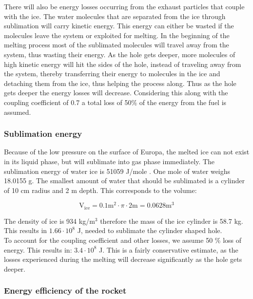 There will also be energy losses occurring from the exhaust particles that couple with the ice. The water molecules that are separated from the ice through sublimation will carry kinetic energy. This energy can either be wasted if the molecules leave the system or exploited for melting. In the beginning of the melting process most of the sublimated molecules will travel away from the system, thus wasting their energy. As the hole gets deeper, more molecules of high kinetic energy will hit the sides of the hole, instead of traveling away from the system, thereby transferring their energy to molecules in the ice and detaching them from the ice, thus helping the process along. Thus as the hole gets deeper the energy losses will decrease. Considering this along with the coupling coefficient of 0.7 a total loss of 50$\%$ of the energy from the fuel is assumed. 


\subsubsection{Sublimation energy}

Because of the low pressure on the surface of Europa, the melted ice can not exist in its liquid phase, but will sublimate into gas phase immediately. The sublimation energy of water ice is 51059 J/mole \cite{water_prop}. One mole of water weighs 18.0155 g. The smallest amount of water that should be sublimated is a cylinder of 10 cm radius and 2 m depth. This corresponds to the volume:

\begin{equation}
\mathrm{V_{ice}}=0.1 \mathrm{m}^2 \cdot \pi \cdot 2 \mathrm{m} = 0.0628 \mathrm{m}^3
\end{equation}

The density of ice is 934 kg/m$^3$ therefore the mass of the ice cylinder is 58.7 kg. This results in $1.66\cdot 10^8$ J, needed to sublimate the cylinder shaped hole. \\

To account for the coupling coefficient and other losses, we assume 50 \% loss of energy. This results in: $3.4 \cdot 10^8$ J. This is a fairly conservative estimate, as the losses experienced during the melting will decrease significantly as the hole gets deeper. 




\subsubsection{Energy efficiency of the rocket}

